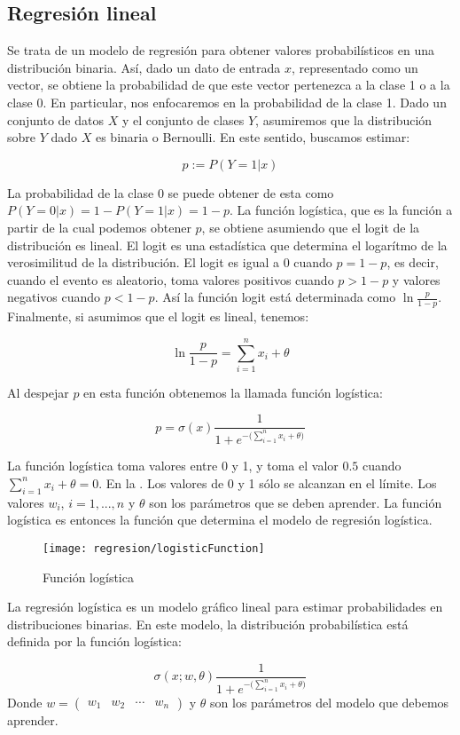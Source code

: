 \subsection{Regresión lineal}

Se trata de un modelo de regresión para obtener valores probabilísticos en una distribución binaria. Así, dado un dato de entrada $x$, representado como un vector, se obtiene la probabilidad de que este vector pertenezca a la clase 1 o a la clase 0. En particular, nos enfocaremos en la probabilidad de la clase 1. Dado un conjunto de datos $X$ y el conjunto de clases $Y$, asumiremos que la distribución sobre $Y$ dado $X$ es binaria o Bernoulli. En este sentido, buscamos estimar:

$$p := P(Y=1|x)$$

La probabilidad de la clase 0 se puede obtener de esta como $P(Y=0|x) = 1-P(Y=1|x) = 1-p$. La función logística, que es la función a partir de la cual podemos obtener $p$, se obtiene asumiendo que el logit de la distribución es lineal. El logit es una estadística que determina el logarítmo de la verosimilitud de la distribución. El logit es igual a 0 cuando $ p = 1-p$, es decir, cuando el evento es aleatorio, toma valores positivos cuando $p > 1-p$ y valores negativos cuando $p < 1-p$. Así la función logit está determinada como $\ln \frac{p}{1-p}$. Finalmente, si asumimos que el logit es lineal, tenemos:

$$\ln \frac{p}{1-p} = \sum_{i=1}^n x_i + \theta$$

Al despejar $p$ en esta función obtenemos la llamada función logística:

$$p = \sigma(x) \frac{1}{1 + e^{-\big(\sum_{i=1}^n x_i + \theta\big)}} $$

La función logística toma valores entre 0 y 1, y toma el valor $0.5$ cuando $\sum_{i=1}^n x_i + \theta = 0$. En la . Los valores de 0 y 1 sólo se alcanzan en el límite. Los valores $w_i$, $i=1,...,n$ y $\theta$ son los parámetros que se deben aprender. La función logística es entonces la función que determina el modelo de regresión logística.


\begin{figure}
 \centering
 \texttt{[image: regresion/logisticFunction]}
 \caption{Función logística}\label{Fig:Logistic}
\end{figure}




\begin{definition}
La regresión logística es un modelo gráfico lineal para estimar probabilidades en distribuciones binarias. En este modelo, la distribución probabilística está definida por la función logística:

$$ \sigma(x; w, \theta) \frac{1}{1 + e^{-\big(\sum_{i=1}^n x_i + \theta\big)}} $$
Donde $w = \begin{pmatrix} w_1 & w_2 & \cdots & w_n \end{pmatrix}$ y $\theta$ son los parámetros del modelo que debemos aprender.
\end{definition}

